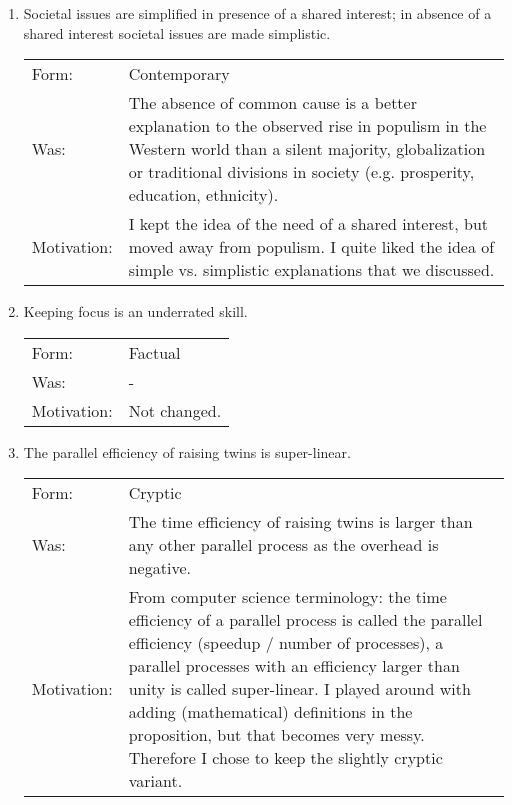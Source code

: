 \documentclass[headinclude,footinclude,cleardoublepage=empty,
numbers=noenddot,fontsize=9pt]{scrbook}
\begin{document}
\begin{enumerate}

\item Societal issues are simplified in presence of a shared
  interest; in absence of a shared interest societal issues are
  made simplistic.

  \begin{tabular}{l p{8cm}}
    Form:       & Contemporary \\
    Was:        & The absence of common cause is a better explanation to
                  the observed rise in populism in the Western world than a silent
                  majority, globalization or traditional divisions in society
                  (e.g. prosperity, education, ethnicity). \\
    Motivation: & I kept the idea of the need of a shared interest, but moved away
                  from populism. I quite liked the idea of simple vs. simplistic
                  explanations that we discussed. \\
  \end{tabular}
  
\item Keeping focus is an underrated skill.

  \begin{tabular}{l p{8cm}}
    Form:       & Factual \\
    Was:        & - \\
    Motivation: & Not changed. \\
  \end{tabular}

\item The parallel efficiency of raising twins is super-linear.

  \begin{tabular}{l p{8cm}}
    Form:       & Cryptic \\
    Was:        & The time efficiency of raising twins is larger than any
                  other parallel process as the overhead is negative. \\
    Motivation: & From computer science terminology: the time efficiency of a
                  parallel process is called the parallel efficiency (speedup /
                  number of processes), a parallel processes with an efficiency larger than unity
                  is called super-linear. I played around with adding (mathematical)
                  definitions in the proposition, but that becomes very
                  messy. Therefore I chose to keep the slightly cryptic variant. \\
  \end{tabular}
  

\end{enumerate}
\end{document}
